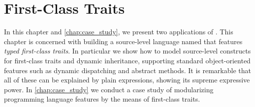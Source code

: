 \chapter{First-Class Traits}
\label{chap:traits}

\renewcommand\ottaltinferrule[4]{
  \inferrule*[narrower=0.9,lab=#1,#2]
    {#3}
    {#4}
}

In this chapter and \cref{chap:case_study}, we present two applications of
\fnamee. This chapter is concerned with building a source-level language named
\sedel that features \textit{typed first-class traits}. In particular we show
how to model source-level constructs for first-class traits and dynamic
inheritance, supporting standard object-oriented features such as dynamic
dispatching and abstract methods. It is remarkable that all of these can be
explained by plain \fnamee expressions, showing its supreme expressive power.
In \cref{chap:case_study} we conduct a case study of modularizing programming
language features by the means of first-class traits.




% 
% 


